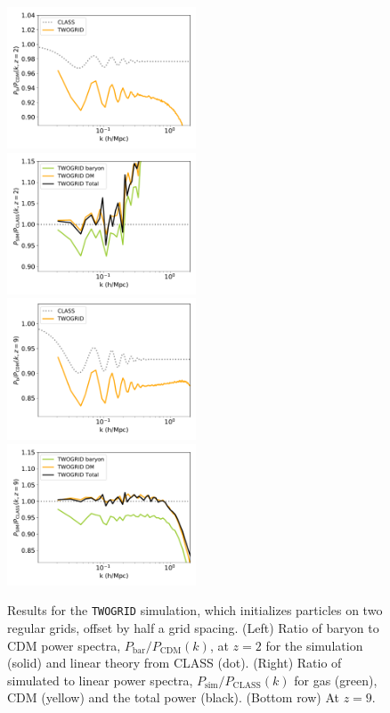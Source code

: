 \documentclass[a4paper,11pt]{article}
\begin{document}
\begin{figure}
  \includegraphics[width=0.5\textwidth]{plots/literature_2_relpower.pdf}
\includegraphics[width=0.5\textwidth]{plots/literature_2_class.pdf} \\
  \includegraphics[width=0.5\textwidth]{plots/literature_9_relpower.pdf}
\includegraphics[width=0.5\textwidth]{plots/literature_9_class.pdf}
\caption{Results for the \texttt{TWOGRID} simulation, which initializes particles on two regular grids, offset by half a grid spacing. (Left) Ratio of baryon to CDM power spectra, $P_\mathrm{bar}/P_\mathrm{CDM}(k)$, at $z=2$ for the simulation (solid) and linear theory from CLASS (dot). (Right) Ratio of simulated to linear power spectra, $P_\mathrm{sim}/P_\mathrm{CLASS}(k)$ for gas (green), CDM (yellow) and the total power (black). (Bottom row) At $z=9$.}
  \label{fig:offsetgrids}
\end{figure}
\end{document}
